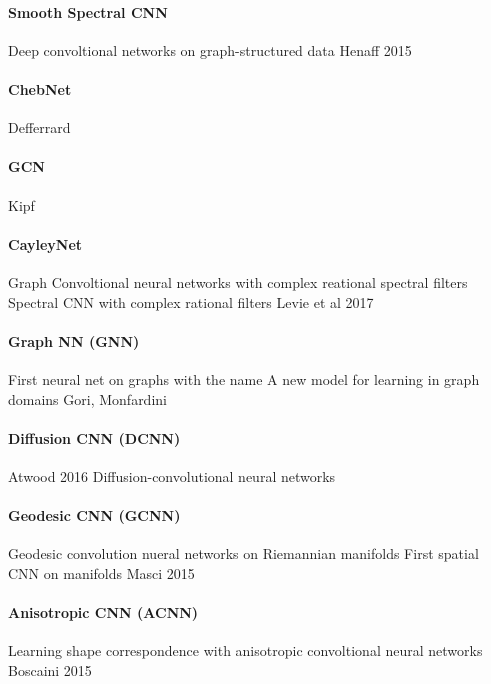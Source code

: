 \documentclass[pdftex,10pt,a4paper]{scrartcl}
\begin{document}
\paragraph{Smooth Spectral CNN}

Deep convoltional networks on graph-structured data
Henaff 2015

\paragraph{ChebNet}

Defferrard

\paragraph{GCN}

Kipf

\paragraph{CayleyNet}

Graph Convoltional neural networks with complex reational spectral filters
Spectral CNN with complex rational filters
Levie et al 2017

\paragraph{Graph NN (GNN)}

First neural net on graphs with the name
A new model for learning in graph domains
Gori, Monfardini

\paragraph{Diffusion CNN (DCNN)}

Atwood 2016
Diffusion-convolutional neural networks

\paragraph{Geodesic CNN (GCNN)}

Geodesic convolution nueral networks on Riemannian manifolds
First spatial CNN on manifolds
Masci 2015

\paragraph{Anisotropic CNN (ACNN)}

Learning shape correspondence with anisotropic convoltional neural networks
Boscaini 2015
\end{document}
